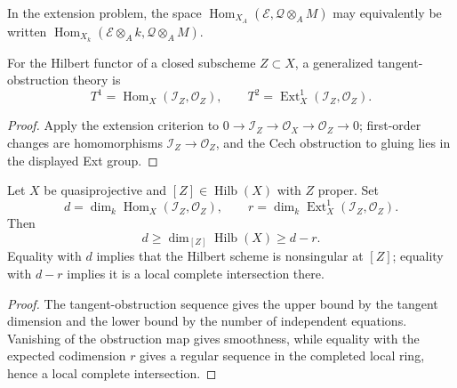 \begin{remark}\label{fga-rem-6-4-6}\uses{}
In the extension problem, the space
$\operatorname{Hom}_{X_A}(\mathcal E,\mathcal Q\otimes_A M)$ may equivalently
be written $\operatorname{Hom}_{X_k}(\mathcal E\otimes_Ak,
\mathcal Q\otimes_A M)$.
\end{remark}

\begin{corollary}\label{fga-cor-6-4-10}
For the Hilbert functor of a closed subscheme $Z\subset X$, a generalized
tangent-obstruction theory is
\[
T^1=\operatorname{Hom}_X(\mathcal I_Z,\mathcal O_Z),\qquad
T^2=\operatorname{Ext}^1_X(\mathcal I_Z,\mathcal O_Z).
\]
\end{corollary}
\begin{proof}
Apply the extension criterion to $0\to\mathcal I_Z\to\mathcal O_X\to
\mathcal O_Z\to0$; first-order changes are homomorphisms
$\mathcal I_Z\to\mathcal O_Z$, and the Cech obstruction to gluing lies in the
displayed Ext group.
\end{proof}

\begin{corollary}\label{fga-cor-6-4-11}
Let $X$ be quasiprojective and $[Z]\in\operatorname{Hilb}(X)$ with $Z$ proper.
Set
\[
d=\dim_k\operatorname{Hom}_X(\mathcal I_Z,\mathcal O_Z),\qquad
r=\dim_k\operatorname{Ext}^1_X(\mathcal I_Z,\mathcal O_Z).
\]
Then
\[
d\ge\dim_{[Z]}\operatorname{Hilb}(X)\ge d-r.
\]
Equality with $d$ implies that the Hilbert scheme is nonsingular at $[Z]$;
equality with $d-r$ implies it is a local complete intersection there.
\end{corollary}
\begin{proof}
The tangent-obstruction sequence gives the upper bound by the tangent dimension
and the lower bound by the number of independent equations.  Vanishing of the
obstruction map gives smoothness, while equality with the expected codimension
$r$ gives a regular sequence in the completed local ring, hence a local complete
intersection.
\end{proof}

